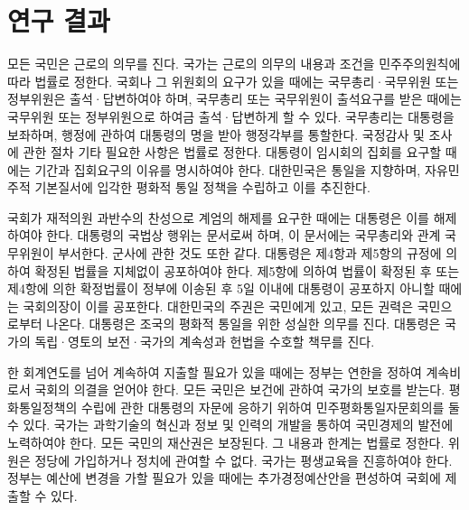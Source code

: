 \documentclass[../document.tex]{subfiles}
\begin{document}
\section{연구 결과}


모든 국민은 근로의 의무를 진다. 국가는 근로의 의무의 내용과 조건을 민주주의원칙에 따라 법률로 정한다. 국회나 그 위원회의 요구가 있을 때에는 국무총리·국무위원 또는 정부위원은 출석·답변하여야 하며, 국무총리 또는 국무위원이 출석요구를 받은 때에는 국무위원 또는 정부위원으로 하여금 출석·답변하게 할 수 있다. 국무총리는 대통령을 보좌하며, 행정에 관하여 대통령의 명을 받아 행정각부를 통할한다. 국정감사 및 조사에 관한 절차 기타 필요한 사항은 법률로 정한다. 대통령이 임시회의 집회를 요구할 때에는 기간과 집회요구의 이유를 명시하여야 한다. 대한민국은 통일을 지향하며, 자유민주적 기본질서에 입각한 평화적 통일 정책을 수립하고 이를 추진한다.

국회가 재적의원 과반수의 찬성으로 계엄의 해제를 요구한 때에는 대통령은 이를 해제하여야 한다. 대통령의 국법상 행위는 문서로써 하며, 이 문서에는 국무총리와 관계 국무위원이 부서한다. 군사에 관한 것도 또한 같다. 대통령은 제4항과 제5항의 규정에 의하여 확정된 법률을 지체없이 공포하여야 한다. 제5항에 의하여 법률이 확정된 후 또는 제4항에 의한 확정법률이 정부에 이송된 후 5일 이내에 대통령이 공포하지 아니할 때에는 국회의장이 이를 공포한다. 대한민국의 주권은 국민에게 있고, 모든 권력은 국민으로부터 나온다. 대통령은 조국의 평화적 통일을 위한 성실한 의무를 진다. 대통령은 국가의 독립·영토의 보전·국가의 계속성과 헌법을 수호할 책무를 진다.

한 회계연도를 넘어 계속하여 지출할 필요가 있을 때에는 정부는 연한을 정하여 계속비로서 국회의 의결을 얻어야 한다. 모든 국민은 보건에 관하여 국가의 보호를 받는다. 평화통일정책의 수립에 관한 대통령의 자문에 응하기 위하여 민주평화통일자문회의를 둘 수 있다. 국가는 과학기술의 혁신과 정보 및 인력의 개발을 통하여 국민경제의 발전에 노력하여야 한다. 모든 국민의 재산권은 보장된다. 그 내용과 한계는 법률로 정한다. 위원은 정당에 가입하거나 정치에 관여할 수 없다. 국가는 평생교육을 진흥하여야 한다. 정부는 예산에 변경을 가할 필요가 있을 때에는 추가경정예산안을 편성하여 국회에 제출할 수 있다.

\biblio
\end{document}
